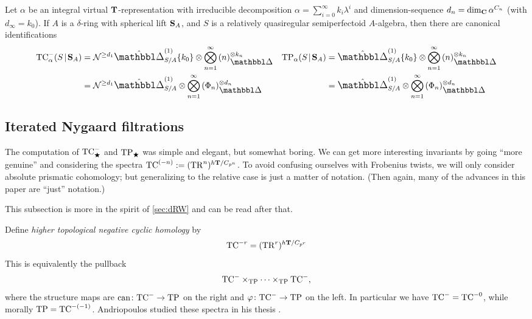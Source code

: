 \begin{proposition}
  \renewcommand{\int}{\mathrm{int}}
  Let $\alpha$ be an integral virtual $\T$-representation with irreducible decomposition $\alpha = \sum_{i=0}^\infty k_i \lambda^i$ and dimension-sequence $d_n = \dim_\C \alpha^{C_n}$ (with $d_\infty=k_0$). If $A$ is a $\delta$-ring with spherical lift $\S_A$, and $S$ is a relatively quasiregular semiperfectoid $A$-algebra, then there are canonical identifications
  \begin{align*}
    \TCmin_\alpha(S\rel \S_A)
    &= \Nyg^{\ge d_1} \prismcpl^{(1)}_{S/A}\{k_0\} \tnsr \bigotimes_{n=1}^\infty {(n)_\prism^{\tnsr k_n}}
    &
    \TP_\alpha(S\rel\S_A)
    &= \prismcpl^{(1)}_{S/A}\{k_0\} \tnsr \bigotimes_{n=1}^\infty {(n)_\prism^{\tnsr k_n}}
    \\
    &=\Nyg^{\ge d_1} \prismcpl^{(1)}_{S/A} \tnsr \bigotimes_{n=1}^\infty {(\Phi_n)_\prism^{\tnsr d_n}}
    &
    &= \prismcpl^{(1)}_{S/A} \tnsr \bigotimes_{n=1}^\infty {(\Phi_n)_\prism^{\tnsr d_n}}
  \end{align*}
\end{proposition}

\subsection{Iterated Nygaard filtrations}
\label{sub:iterated-nygaard}

\allowdisplaybreaks

The computation of $\TCmin_\rog$ and $\TP_\rog$ was simple and elegant, but somewhat boring. We can get more interesting invariants by going ``more genuine'' and considering the spectra $\TC^{(-n)} \defeq (\TR^n)^{h\T/C_{p^n}}$. To avoid confusing ourselves with Frobenius twists, we will only consider absolute prismatic cohomology; but generalizing to the relative case is just a matter of notation. (Then again, many of the advances in this paper are ``just'' notation.)

This subsection is more in the spirit of \sec\ref{sec:dRW} and can be read after that. 

\begin{definition}
  \label{rmk:iterated-nygaard}
  Define \emph{higher topological negative cyclic homology} by
  \[ \TC^{-r} = (\TR^r)^{h\T/C_{p^r}} \]
  This is equivalently the pullback 
  \[ \TCmin\times_\TP \dotsb \times_\TP \TCmin, \]
  where the structure maps are $\can\colon \TCmin\to \TP$ on the right and $\varphi\colon \TCmin\to\TP$ on the left. In particular we have $\TCmin=\TC^{-0}$, while morally $\TP=\TC^{-(-1)}$. Andriopoulos studied these spectra in his thesis \cite{AndriopoulosHigherNygaard}.
\end{definition}

